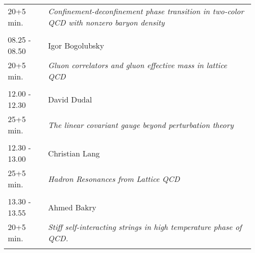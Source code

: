 \begin{longtable}{p{3cm}p{13cm}}
20+5 min. & {\it Confinement-deconfinement phase transition in two-color QCD with nonzero baryon density}\\ 
 & \\ 
08.25 - 08.50 & Igor Bogolubsky\\ 
20+5 min. & {\it Gluon correlators and gluon effective mass in lattice QCD}\\ 
 & \\ 
12.00 - 12.30 & David Dudal\\ 
25+5 min. & {\it The linear covariant gauge beyond perturbation theory}\\ 
 & \\ 
12.30 - 13.00 & Christian Lang\\ 
25+5 min. & {\it Hadron Resonances from Lattice QCD}\\ 
 & \\ 
13.30 - 13.55 & Ahmed Bakry\\ 
20+5 min. & {\it Stiff self-interacting strings in high temperature phase of QCD.}\\ 
 & \\ 
\end{longtable}

